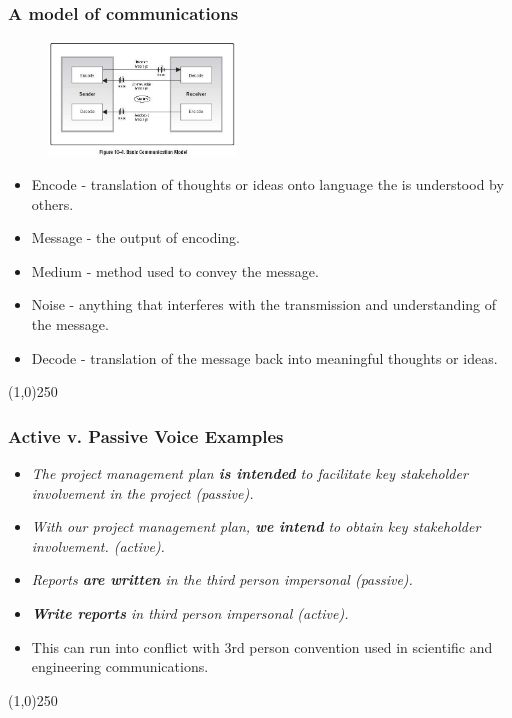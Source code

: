 \begin{frame}
\frametitle{A model of communications}
\begin{figure}
	\centering
		\includegraphics[width = 5cm]{images/Fig10-4.jpg}
	\label{fig:10-4}
\end{figure}
\begin{itemize}
	\item Encode - translation of thoughts or ideas onto language the is understood by others. 
	\item Message - the output of encoding.
	\item Medium - method used to convey the message.
	\item Noise - anything that interferes with the transmission and understanding of the message.
	\item Decode - translation of the message back into meaningful thoughts or ideas.
\end{itemize}
\end{frame}\begin{center}\line(1,0){250}\end{center}



\begin{frame}
\frametitle{Active v. Passive Voice \hfill\hfill Examples}
\begin{itemize}
	\item \textit{The project management plan \textbf{is intended} to facilitate key stakeholder involvement in the project (passive).}\\
	\item\textit{With our project management plan, \textbf{we intend} to obtain key stakeholder involvement. (active).}\\
	\item\textit{Reports \textbf{are written} in the third person impersonal (passive).}\\
	\item\textit{\textbf{Write reports} in third person impersonal (active).}
\end{itemize}	
	
\begin{itemize}
	\item This can run into conflict with 3rd person convention used in scientific and engineering communications.
\end{itemize}

\end{frame}\begin{center}\line(1,0){250}\end{center}




